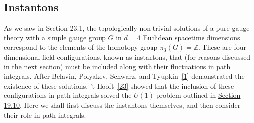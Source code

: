 \subsection{Instantons}
\label{sec:23.5}

As we saw in \hyperref[sec:23.1]{Section 23.1}, the topologically non-trivial solutions of a
pure gauge theory with a simple gauge group $G$ in $d=4$ Euclidean
spacetime dimensions correspond to the elements of the homotopy group
$\pi_3(G)=\mathbb{Z}$. These are four-dimensional field configurations, known as
instantons, that (for reasons discussed in the next section) must be
included along with their fluctuations in path integrals. After Belavin,
Polyakov, Schwarz, and Tyupkin~\hyperref[ch23-ref-1]{[1]} demonstrated the
existence of these solutions, 't Hooft~\hyperref[ch23-ref-23]{[23]} showed
that the inclusion of these configurations in path integrals solved the
$U(1)$ problem outlined in \hyperref[sec:19.10]{Section 19.10}. Here we shall first discuss the
instantons themselves, and then consider their role in path integrals.

